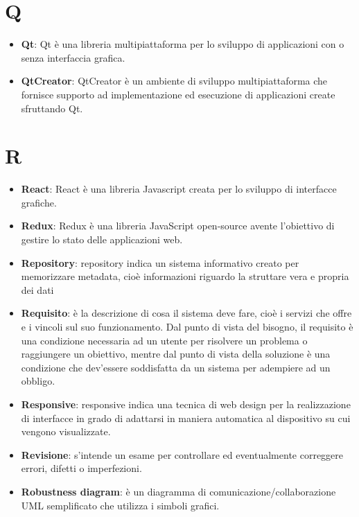 \documentclass[a4paper, oneside, openany]{article}
\begin{document}
\section{Q}
\begin{itemize}
\item \textbf{Qt}: Qt è una libreria multipiattaforma per lo sviluppo di applicazioni con o senza interfaccia grafica.
\item \textbf{QtCreator}: QtCreator è un ambiente di sviluppo multipiattaforma che fornisce supporto ad implementazione ed esecuzione di applicazioni create sfruttando Qt.
\end{itemize}

\section{R}
\begin{itemize}
\item \textbf{React}: React è una libreria Javascript creata per lo sviluppo di interfacce grafiche.
\item \textbf{Redux}: Redux è una libreria JavaScript open-source avente l'obiettivo di gestire lo stato delle applicazioni web.
\item \textbf{Repository}: repository indica un sistema informativo creato per memorizzare metadata, cioè informazioni riguardo la struttare vera e propria dei dati
\item \textbf{Requisito}: è la descrizione di cosa il sistema deve fare, cioè i servizi che offre e i vincoli sul suo funzionamento. Dal punto di vista del bisogno, il requisito è una condizione necessaria ad un utente per risolvere un problema o raggiungere un obiettivo, mentre dal punto di vista della soluzione è una condizione che dev'essere soddisfatta da un sistema per adempiere ad un obbligo.
\item \textbf{Responsive}: responsive indica una tecnica di web design per la realizzazione di interfacce in grado di adattarsi in maniera automatica al dispositivo su cui vengono visualizzate.
\item \textbf{Revisione}: s'intende un esame per controllare ed eventualmente correggere errori, difetti o imperfezioni.
\item \textbf{Robustness diagram}: è un diagramma di comunicazione/collaborazione UML semplificato che utilizza i simboli grafici.
\end{itemize}
\end{document}
